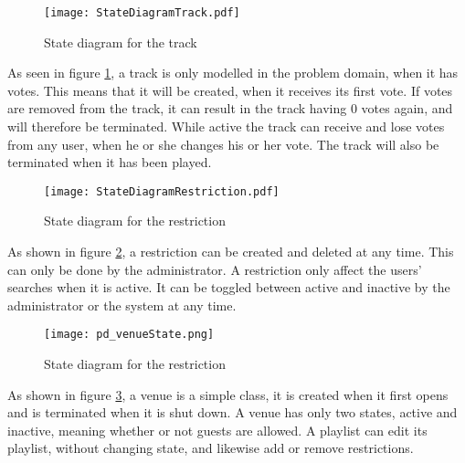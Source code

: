\begin{figure}[H]
  \centering
  \texttt{[image: StateDiagramTrack.pdf]}
  \caption{State diagram for the track}\label{fig:StateDiagramTrack}
\end{figure}
As seen in figure \cref{fig:StateDiagramTrack}, a track is only modelled in the problem domain, when it has votes. This means that it will be created, when it receives its first vote. If votes are removed from the track, it can result in the track having 0 votes again, and will therefore be terminated. While active the track can receive and lose votes from any user, when he or she changes his or her vote. The track will also be terminated when it has been played.

\begin{figure}[H]
  \centering
  \texttt{[image: StateDiagramRestriction.pdf]}
  \caption{State diagram for the restriction}\label{fig:StateDiagramRestriction}
\end{figure}
As shown in figure \cref{fig:StateDiagramRestriction}, a restriction can be created and deleted at any time. This can only be done by the administrator. A restriction only affect the users' searches when it is active. It can be toggled between active and inactive by the administrator or the system at any time.

\begin{figure}[H]
  \centering
  \texttt{[image: pd\_venueState.png]}
  \caption{State diagram for the restriction}\label{fig:StateDiagramVenue}
\end{figure}
As shown in figure \cref{fig:StateDiagramVenue}, a venue is a simple class, it is created when it first opens and is terminated when it is shut down. A venue has only two states, active and inactive, meaning whether or not guests are allowed. A playlist can edit its playlist, without changing state, and likewise add or remove restrictions.